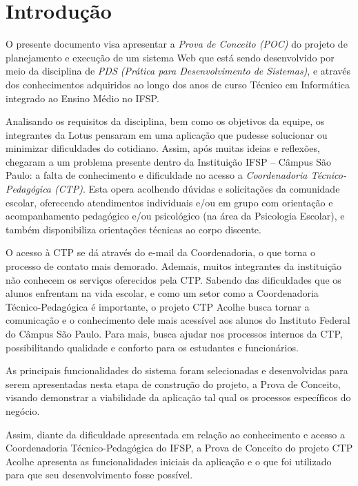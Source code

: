 \documentclass[12pt,a4paper]{article}
\begin{document}
\newpage

\tableofcontents

\newpage

\section{Introdução}
\pagestyle{plain}

O presente documento visa apresentar a \textit{Prova de Conceito (POC)} do projeto de planejamento e execução de um sistema Web que está sendo desenvolvido por meio da disciplina de \textit{PDS (Prática para Desenvolvimento de Sistemas)}, e através dos conhecimentos adquiridos ao longo dos anos de curso Técnico em Informática integrado ao Ensino Médio no IFSP. 

Analisando os requisitos da disciplina, bem como os objetivos da equipe, os integrantes da Lotus pensaram em uma aplicação que pudesse solucionar ou minimizar dificuldades do cotidiano. Assim, após muitas ideias e reflexões, chegaram a um problema presente dentro da Instituição IFSP – Câmpus São Paulo: a falta de conhecimento e dificuldade no acesso a \textit{Coordenadoria Técnico-Pedagógica (CTP)}. Esta opera acolhendo dúvidas e solicitações da comunidade escolar, oferecendo atendimentos individuais e/ou em grupo com orientação e acompanhamento pedagógico e/ou psicológico (na área da Psicologia Escolar), e também disponibiliza orientações técnicas ao corpo discente. 

O acesso à CTP se dá através do e-mail da Coordenadoria, o que torna o processo de contato mais demorado. Ademais, muitos integrantes da instituição não conhecem os serviços oferecidos pela CTP. Sabendo das dificuldades que os alunos enfrentam na vida escolar, e como um setor como a Coordenadoria Técnico-Pedagógica é importante, o projeto CTP Acolhe busca tornar a comunicação e o conhecimento dele mais acessível aos alunos do Instituto Federal do Câmpus São Paulo. Para mais, busca ajudar nos processos internos da CTP, possibilitando qualidade e conforto para os estudantes e funcionários.   

As principais funcionalidades do sistema foram selecionadas e desenvolvidas para serem apresentadas nesta etapa de construção do projeto, a Prova de Conceito, visando demonstrar a viabilidade da aplicação tal qual os processos específicos do negócio. 

Assim, diante da dificuldade apresentada em relação ao conhecimento e acesso a Coordenadoria Técnico-Pedagógica do IFSP, a Prova de Conceito do projeto CTP Acolhe apresenta as funcionalidades iniciais da aplicação e o que foi utilizado para que seu desenvolvimento fosse possível.
\end{document}
